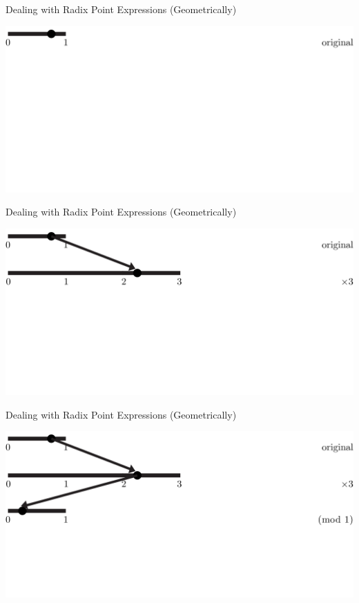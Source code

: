 \documentclass{beamer}
\begin{document}
\begin{frame}{Dealing with Radix Point Expressions (Geometrically)}
  \begin{example}
    \includegraphics[width=\textwidth,height=0.75\textheight]{images/Ternary/1}
  \end{example}
\end{frame}

\begin{frame}{Dealing with Radix Point Expressions (Geometrically)}
  \addtocounter{framenumber}{-1}
  \begin{example}
    \includegraphics[width=\textwidth,height=0.75\textheight]{images/Ternary/2}
  \end{example}
\end{frame}

\begin{frame}{Dealing with Radix Point Expressions (Geometrically)}
  \addtocounter{framenumber}{-1}
  \begin{example}
    \includegraphics[width=\textwidth,height=0.75\textheight]{images/Ternary/3}
  \end{example}
\end{frame}
\end{document}
